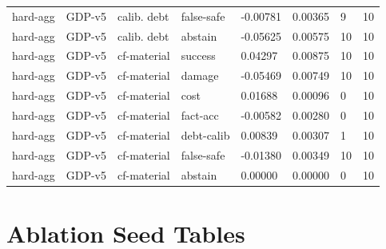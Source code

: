 \documentclass{article}
\begin{document}
\begin{center}
\begin{longtable}{llllllll}
hard-agg & GDP-v5 & calib. debt & false-safe & -0.00781 & 0.00365 & 9 & 10 \\
hard-agg & GDP-v5 & calib. debt & abstain & -0.05625 & 0.00575 & 10 & 10 \\
hard-agg & GDP-v5 & cf-material & success & 0.04297 & 0.00875 & 10 & 10 \\
hard-agg & GDP-v5 & cf-material & damage & -0.05469 & 0.00749 & 10 & 10 \\
hard-agg & GDP-v5 & cf-material & cost & 0.01688 & 0.00096 & 0 & 10 \\
hard-agg & GDP-v5 & cf-material & fact-acc & -0.00582 & 0.00280 & 0 & 10 \\
hard-agg & GDP-v5 & cf-material & debt-calib & 0.00839 & 0.00307 & 1 & 10 \\
hard-agg & GDP-v5 & cf-material & false-safe & -0.01380 & 0.00349 & 10 & 10 \\
hard-agg & GDP-v5 & cf-material & abstain & 0.00000 & 0.00000 & 0 & 10 \\
\bottomrule
\end{longtable}
\renewcommand{\arraystretch}{1.0}
\end{center}

\clearpage
\section{Ablation Seed Tables}
\end{document}
